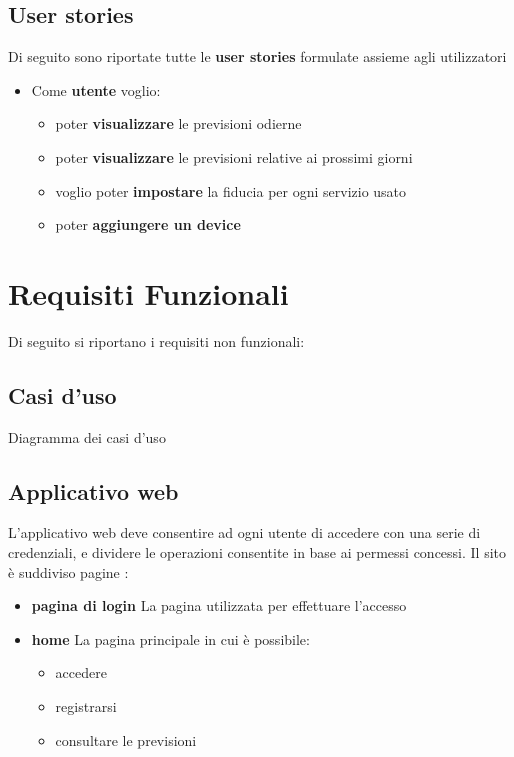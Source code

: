         \subsection{User stories}
        Di seguito sono riportate tutte le \textbf{user stories} formulate assieme agli utilizzatori
        \begin{itemize}
            \item Come \textbf{utente}
            voglio:
            \begin{itemize}
                \item poter \textbf{visualizzare} le previsioni odierne
                \item poter \textbf{visualizzare} le previsioni relative ai prossimi giorni
                \item voglio poter \textbf{impostare} la fiducia per ogni servizio usato
                \item poter \textbf{aggiungere un device} 
                
            \end{itemize}
        \end{itemize}
            
	    
	\section{Requisiti Funzionali} %
	Di seguito si riportano i requisiti non funzionali:
	    \subsection{Casi d'uso}
        	 Diagramma dei casi d'uso
                    
        \subsection{Applicativo web}
        L'applicativo web deve consentire ad ogni utente di accedere con una serie di credenziali, e dividere le operazioni consentite in base ai permessi concessi.
        Il sito è suddiviso pagine :
        \begin{itemize}
            \item \textbf{pagina di login}
                La pagina utilizzata per effettuare l'accesso
            \item \textbf{home}
                La pagina principale in cui è possibile:
                \begin{itemize}
                    \item accedere
                    \item registrarsi
                    \item consultare le previsioni
                \end{itemize}
            
        \end{itemize}
        
